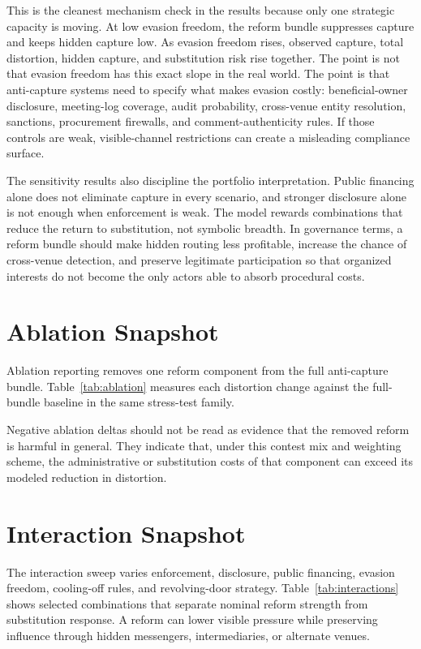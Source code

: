 

This is the cleanest mechanism check in the results because only one strategic capacity is moving. At low evasion freedom, the reform bundle suppresses capture and keeps hidden capture low. As evasion freedom rises, observed capture, total distortion, hidden capture, and substitution risk rise together. The point is not that evasion freedom has this exact slope in the real world. The point is that anti-capture systems need to specify what makes evasion costly: beneficial-owner disclosure, meeting-log coverage, audit probability, cross-venue entity resolution, sanctions, procurement firewalls, and comment-authenticity rules. If those controls are weak, visible-channel restrictions can create a misleading compliance surface.

The sensitivity results also discipline the portfolio interpretation. Public financing alone does not eliminate capture in every scenario, and stronger disclosure alone is not enough when enforcement is weak. The model rewards combinations that reduce the return to substitution, not symbolic breadth. In governance terms, a reform bundle should make hidden routing less profitable, increase the chance of cross-venue detection, and preserve legitimate participation so that organized interests do not become the only actors able to absorb procedural costs.

\section{Ablation Snapshot}

Ablation reporting removes one reform component from the full anti-capture bundle. Table~\ref{tab:ablation} measures each distortion change against the full-bundle baseline in the same stress-test family.



Negative ablation deltas should not be read as evidence that the removed reform is harmful in general. They indicate that, under this contest mix and weighting scheme, the administrative or substitution costs of that component can exceed its modeled reduction in distortion.

\section{Interaction Snapshot}

The interaction sweep varies enforcement, disclosure, public financing, evasion freedom, cooling-off rules, and revolving-door strategy. Table~\ref{tab:interactions} shows selected combinations that separate nominal reform strength from substitution response. A reform can lower visible pressure while preserving influence through hidden messengers, intermediaries, or alternate venues.

